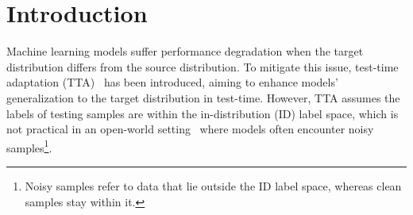 \section{Introduction}
Machine learning models suffer performance degradation when the target distribution differs from the source distribution. To mitigate this issue, test-time adaptation (TTA)~\citep{wang2021tent, niu2023towards, wang2022continual, gao2023back, liang2023ttasurvey} has been introduced, aiming to enhance models' generalization to the target distribution in test-time. However, TTA assumes the labels of testing samples are within the in-distribution (ID) label space, which is not practical in an open-world setting~\citep{yang2022openood, yang2021generalized} where models often encounter noisy samples\footnote{Noisy samples refer to data that lie outside the ID label space, whereas clean samples stay within it.}.

